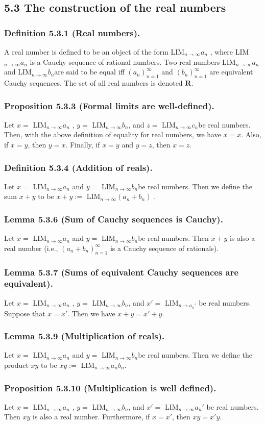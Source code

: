 \documentclass[12pt, letter]{article}
\newcommand{\an}{$(a_n)_{n=1}^\infty$ }
\newcommand{\bn}{$(b_n)_{n=1}^\infty$ }
\newcommand{\la}{LIM$_{n\to\infty}a_n$  }
\newcommand{\lb}{LIM$_{n\to\infty}b_n$}
\newcommand{\lc}{LIM$_{n\to\infty}c_n$}
\newcommand{\lab}{LIM$_{n\to\infty}(a_n+b_n)$ }
\begin{document}
\subsection*{5.3 The construction of the real numbers}
\subsubsection*{Definition 5.3.1 (Real numbers).}
A real number is defined to be an object of the form \la, where \la is a Cauchy sequence of rational numbers. Two real numbers \la and \lb are said to be equal iff 
\an and \bn are equivalent Cauchy sequences. The set of all real numbers is denoted $\mathbf{R}$.
\subsubsection*{Proposition 5.3.3 (Formal limits are well-defined).}
Let $x=$ \la, $y=$ \lb, and $z=$ \lc be real numbers. Then, with the above definition of equality for real numbers, we have $x=x$. Also, if $x=y$, then $y=x$.
Finally, if $x=y$ and $y=z$, then $x=z$.
\subsubsection*{Definition 5.3.4 (Addition of reals).}
Let $x=$ \la and $y=$ \lb be real numbers. Then we define the sum $x+y$ to be $x+y:=$ \lab.
\subsubsection*{Lemma 5.3.6 (Sum of Cauchy sequences is Cauchy).}
Let $x=$ \la and $y=$ \lb be real numbers. Then $x+y$ is also a real number (i.e., $(a_n+b_n)_{n=1}^\infty$ is a Cauchy sequence of rationals).
\subsubsection*{Lemma 5.3.7 (Sums of equivalent Cauchy sequences are equivalent).}
Let $x=$ \la, $y=$ \lb, and $x'=$ LIM$_{n\to a_n'}$ be real numbers. Suppose that $x=x'$. Then we have $x+y=x'+y$.
\subsubsection*{Lemma 5.3.9 (Multiplication of reals).}
Let $x=$ \la and $y=$ \lb be real numbers. Then we define the product $xy$ to be $xy:=$ LIM$_{n\to\infty}a_n b_n$.
\subsubsection*{Proposition 5.3.10 (Multiplication is well defined).}
Let $x=$ \la, $y=$ \lb, and $x'=$ LIM$_{n\to\infty}a_n'$ be real numbers. Then $xy$ is also a real number. Furthermore, if $x=x'$, then $xy=x'y$.
\end{document}
